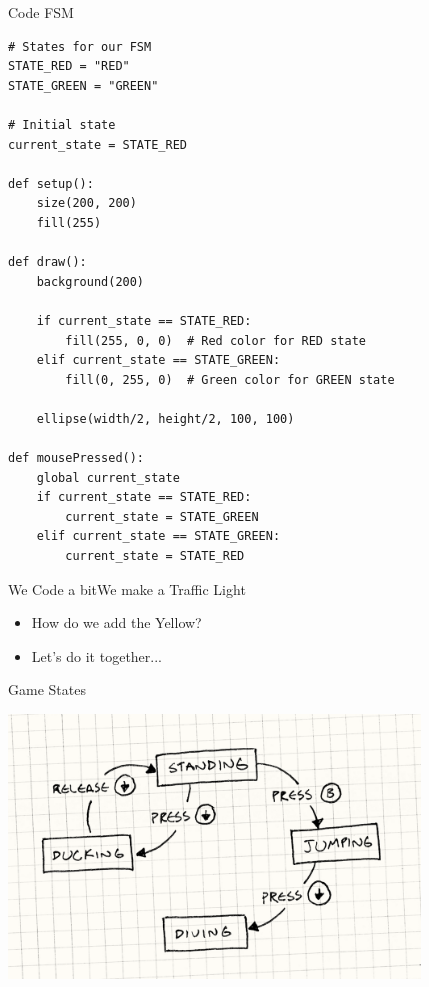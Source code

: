 \documentclass[10pt]{beamer}
\begin{document}
\begin{frame}[fragile]{Code FSM}
\begin{lstlisting}
# States for our FSM
STATE_RED = "RED"
STATE_GREEN = "GREEN"

# Initial state
current_state = STATE_RED

def setup():
    size(200, 200)
    fill(255)

def draw():
    background(200)
    
    if current_state == STATE_RED:
        fill(255, 0, 0)  # Red color for RED state
    elif current_state == STATE_GREEN:
        fill(0, 255, 0)  # Green color for GREEN state
    
    ellipse(width/2, height/2, 100, 100)

def mousePressed():
    global current_state
    if current_state == STATE_RED:
        current_state = STATE_GREEN
    elif current_state == STATE_GREEN:
        current_state = STATE_RED
\end{lstlisting}
\end{frame}


\begin{frame}{We Code a bit}{We make a Traffic Light}

\begin{itemize}
	 \item How do we add the Yellow?
	 \item Let's do it together...
\end{itemize}
\end{frame}




\begin{frame}{Game States}
\begin{center}
    	 \includegraphics[height=7cm]{images/gameflowchart}
\end{center}
\end{frame}
\end{document}
